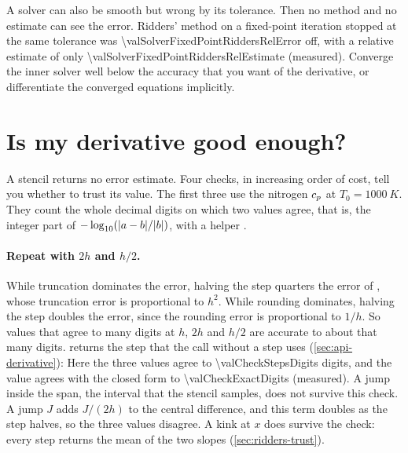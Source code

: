 A solver can also be smooth but wrong by its tolerance. Then no method and no estimate can see the error. Ridders'
method on a fixed-point iteration stopped at the same tolerance was
\num{\valSolverFixedPointRiddersRelError} off, with a relative estimate of only
\num{\valSolverFixedPointRiddersRelEstimate} (measured). Converge the inner solver well below the accuracy that you
want of the derivative, or differentiate the converged equations implicitly.

\section{Is my derivative good enough?}\label{sec:using-check}

A stencil returns no error estimate. Four checks, in increasing order of cost, tell you whether to trust its value.
The first three use the nitrogen $c_p$ at $T_0 = \SI{1000}{K}$. They count the whole decimal digits on which two
values agree, that is, the integer part of $-\log_{10}(\lvert a - b \rvert / \lvert b \rvert)$, with a helper .

\paragraph{Repeat with $2h$ and $h/2$.} While truncation dominates the error, halving the step quarters the error of
, whose truncation error is proportional to $h^2$. While rounding dominates, halving the step doubles
the error, since the rounding error is proportional to $1/h$. So values that agree to many digits at $h$, $2h$ and
$h/2$ are accurate to about that many digits.  returns the step that the call without a
step uses (\cref{sec:api-derivative}):
Here the three values agree to \num{\valCheckStepsDigits} digits, and the value agrees with the closed form to
\num{\valCheckExactDigits} (measured). A jump inside the span, the interval that the stencil samples, does not survive
this check. A jump $J$ adds $J / (2h)$ to the central difference, and this term doubles as the step halves, so the
three values disagree. A kink at $x$ does survive the check: every step returns the mean of the two slopes
(\cref{sec:ridders-trust}).

